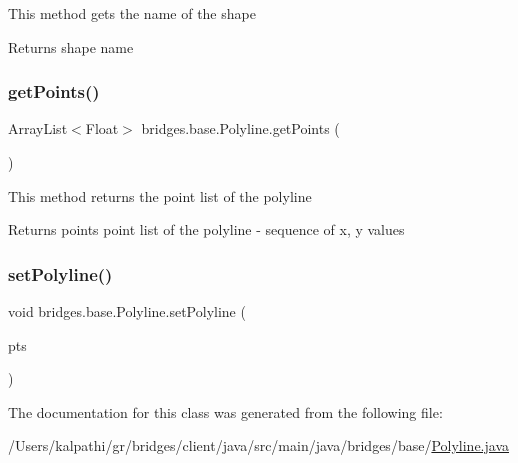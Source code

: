 This method gets the name of the shape

\begin{DoxyReturn}{Returns}
shape name 
\end{DoxyReturn}
\mbox{\label{classbridges_1_1base_1_1_polyline_ae610d680975558db90a06949991583f8}} 
\subsubsection{\texorpdfstring{get\+Points()}{getPoints()}}
{\footnotesize\ttfamily Array\+List$<$Float$>$ bridges.\+base.\+Polyline.\+get\+Points (\begin{DoxyParamCaption}{ }\end{DoxyParamCaption})}

This method returns the point list of the polyline

\begin{DoxyReturn}{Returns}
points point list of the polyline -\/ sequence of x, y values 
\end{DoxyReturn}
\mbox{\label{classbridges_1_1base_1_1_polyline_a3fec0c95e9f26b173cba105bd39e9df1}} 
\subsubsection{\texorpdfstring{set\+Polyline()}{setPolyline()}}
{\footnotesize\ttfamily void bridges.\+base.\+Polyline.\+set\+Polyline (\begin{DoxyParamCaption}\item[{Array\+List$<$ Float $>$}]{pts }\end{DoxyParamCaption})}



The documentation for this class was generated from the following file\+:\begin{DoxyCompactItemize}
\item 
/\+Users/kalpathi/gr/bridges/client/java/src/main/java/bridges/base/\mbox{\hyperlink{_polyline_8java}{Polyline.\+java}}\end{DoxyCompactItemize}
